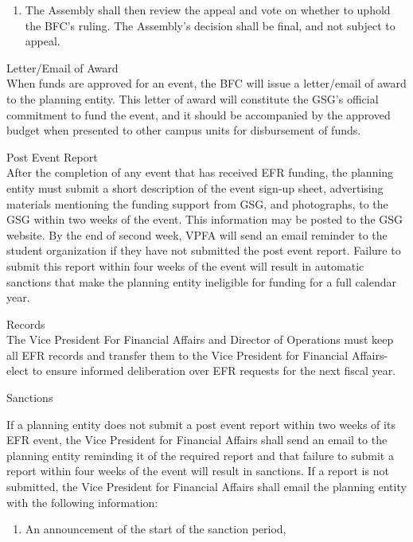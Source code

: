 \begin{bylaws-number}
\begin{bylaws-number}
\begin{enumerate}[i]
  \item The Assembly shall then review the appeal and vote on whether to uphold the BFC’s ruling. The Assembly’s decision shall be final, and not subject to appeal.
\end{enumerate}
\end{bylaws-number}
  \item Letter/Email of Award \hfill \\
When funds are approved for an event, the BFC will issue a letter/email of award to the planning entity. This letter of award will constitute the GSG’s official commitment to fund the event, and it should be accompanied by the approved budget when presented to other campus units for disbursement of funds.
  \item Post Event Report \hfill \\
  After the completion of any event that has received EFR funding, the planning entity must submit a short description of the event sign-up sheet, advertising materials mentioning the funding support from GSG, and photographs, to the GSG within two weeks of the event.  This information may be posted to the GSG website. By the end of second week, VPFA will send an email reminder to the student organization if they have not submitted the post event report. Failure to submit this report within four weeks of the event will result in automatic sanctions that make the planning entity ineligible for funding for a full calendar year.
  \item Records \hfill \\
  The Vice President For Financial Affairs and Director of Operations must keep all EFR records and transfer them to the Vice President for Financial Affairs-elect to ensure informed deliberation over EFR requests for the next fiscal year.
  \item Sanctions
\begin{bylaws-number}
  \item If a planning entity does not submit a post event report within two weeks of its EFR event, the Vice President for Financial Affairs shall send an email to the planning entity reminding it of the required report and that failure to submit a report within four weeks of the event will result in sanctions. If a report is not submitted, the Vice President for Financial Affairs shall email the planning entity with the following information:
  \begin{enumerate}[i]
    \item An announcement of the start of the sanction period,

\end{enumerate}
\end{bylaws-number}
\end{bylaws-number}
